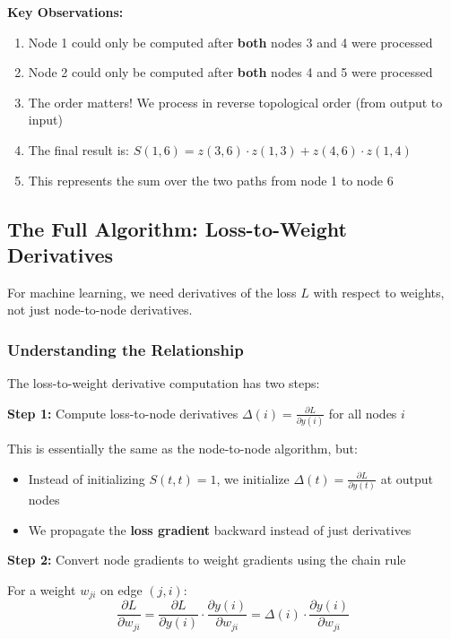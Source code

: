 \begin{notechapter}
\textbf{Key Observations:}
\begin{enumerate}
    \item Node 1 could only be computed after \textbf{both} nodes 3 and 4 were processed
    \item Node 2 could only be computed after \textbf{both} nodes 4 and 5 were processed
    \item The order matters! We process in reverse topological order (from output to input)
    \item The final result is: $S(1,6) = z(3,6) \cdot z(1,3) + z(4,6) \cdot z(1,4)$
    \item This represents the sum over the two paths from node 1 to node 6
\end{enumerate}

\subsection{The Full Algorithm: Loss-to-Weight Derivatives}

For machine learning, we need derivatives of the loss $L$ with respect to weights, not just node-to-node derivatives.

\subsubsection{Understanding the Relationship}

\begin{tcolorbox}[colback=examplecolor,colframe=nodecolor,title=Key Insight: From Node-to-Node to Loss-to-Weight]
The loss-to-weight derivative computation has two steps:

\textbf{Step 1:} Compute loss-to-node derivatives $\Delta(i) = \frac{\partial L}{\partial y(i)}$ for all nodes $i$

This is essentially the same as the node-to-node algorithm, but:
\begin{itemize}
    \item Instead of initializing $S(t,t) = 1$, we initialize $\Delta(t) = \frac{\partial L}{\partial y(t)}$ at output nodes
    \item We propagate the \textbf{loss gradient} backward instead of just derivatives
\end{itemize}

\textbf{Step 2:} Convert node gradients to weight gradients using the chain rule

For a weight $w_{ji}$ on edge $(j,i)$:
$$\frac{\partial L}{\partial w_{ji}} = \frac{\partial L}{\partial y(i)} \cdot \frac{\partial y(i)}{\partial w_{ji}} = \Delta(i) \cdot \frac{\partial y(i)}{\partial w_{ji}}$$
\end{tcolorbox}


\end{notechapter}
